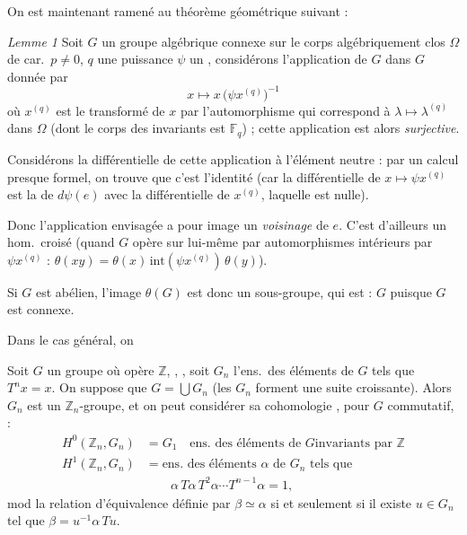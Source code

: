 \documentclass[11pt,a4paper]{article}
\begin{document}
On est maintenant ramené au théorème géométrique suivant :


\emph{Lemme 1} \quad Soit $G$ un groupe algébrique connexe sur le corps
algébriquement clos $\Omega$ de car.\ $p \neq 0$,   $q$ une puissance
\struck{\ill{}} $\psi$ un  \struck{\ill{}}, considérons  l'application de $G$ dans $G$ donnée par
\[
  x \longmapsto x\,\bigl(\psi x^{(q)}\bigr)^{-1}
\]
où $x^{(q)}$ est le transformé de $x$ par l'automorphisme qui correspond à
$\lambda \mapsto \lambda^{(q)}$ dans $\Omega$ (dont le corps des invariants
est $\mathbb{F}_q$) ; cette application est alors \emph{surjective}.

Considérons la différentielle de cette application à l'élément neutre : par
un calcul presque formel, on trouve que c'est l'identité (car la
différentielle de $x \mapsto \psi x^{(q)}$ est la \struck{\ill{}}
 de $d\psi(e)$ avec la différentielle de $x^{(q)}$, laquelle
est nulle).

Donc l'application envisagée a pour image un \emph{voisinage} de $e$. C'est
d'ailleurs un hom.\ croisé (quand $G$ opère sur lui-même par automorphismes
intérieurs par $\psi x^{(q)}$ : $\theta(xy) = \theta(x)\,
\mathrm{int}(\psi x^{(q)})\,\theta(y)$).

Si $G$ est abélien, l'image $\theta(G)$ est donc un sous-groupe, qui est
\add{\ill{} \ill{}} \struck{\ill{}} : $G$ puisque $G$ est connexe.

Dans le cas général, on \ill{}


Soit $G$ un groupe où opère $\mathbb{Z}$, , 
\struck{\ill{}} , soit $G_n$ l'ens.\ des éléments de $G$ tels que
$T^{n}x = x$. On suppose que $G = \bigcup G_n$ (les $G_n$ forment une suite
croissante). Alors $G_n$ est un $\mathbb{Z}_n$-groupe, et on peut considérer
sa cohomologie \add{\ill{}} \ill{}, pour $G$ commutatif,  :
\begin{align*}
  H^0(\mathbb{Z}_n, G_n) &= G_1 \quad \text{ens.\ des éléments de $G$
    invariants par $\mathbb{Z}$} \\
  H^1(\mathbb{Z}_n, G_n) &= \text{ens.\ des éléments $\alpha$ de $G_n$ tels
    que} \\
  &\qquad \alpha\,T\alpha\,T^{2}\alpha \cdots T^{n-1}\alpha = 1 ,
\end{align*}
mod la relation d'équivalence définie par $\beta \simeq \alpha$ si et
seulement si il existe $u \in G_n$ tel que $\beta = u^{-1}\alpha\,Tu$.
\end{document}
